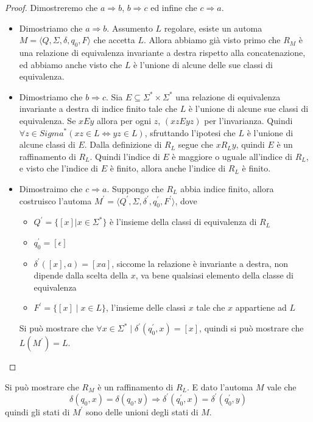 \documentclass[12pt]{article}
\begin{document}
\begin{proof}
	Dimostreremo che $a \Rightarrow b$, $b \Rightarrow c$ ed infine che $c \Rightarrow a$.
	\begin{itemize}
		\item Dimostriamo che $a \Rightarrow b$.
			Assumento $L$ regolare, esiste un automa $M = \langle Q, \Sigma, \delta, q_0, F\rangle$ che accetta $L$.
			Allora abbiamo già visto primo che $R_M$ è una relazione di equivalenza invariante a destra rispetto alla concatenazione, ed abbiamo anche visto che $L$ è l'unione di alcune delle sue classi di equivalenza.
		\item Dimostriamo che $b \Rightarrow c$.
			Sia $E \subseteq \Sigma^* \times \Sigma^*$ una relazione di equivalenza invariante a destra di indice finito tale che $L$ è l'unione di alcune sue classi di equivalenza.
			Se $x E y$ allora per ogni $z$, $(xz E yz)$ per l'invarianza.
			Quindi $ \forall z \in Sigma^* (xz \in L \Leftrightarrow yz \in L)$, sfruttando l'ipotesi che $L$ è l'unione di alcune classi di $E$.
			Dalla definizione di $R_L$ segue che $x R_L y$, quindi $E$ è un raffinamento di $R_L$.
			Quindi l'indice di $E$ è maggiore o uguale all'indice di $R_L$, e visto che l'indice di $E$ è finito, allora anche l'indice di $R_L$ è finito.
		\item Dimostraimo che $c \Rightarrow a$.
			Suppongo che $R_L$ abbia indice finito, allora costruisco l'automa $M^\prime = \langle Q^\prime, \Sigma, \delta^\prime, q_0^\prime, F^\prime \rangle$, dove 
			\begin{itemize}
				\item $Q^\prime = \{ [ x ] | x \in \Sigma^* \}$ è l'insieme della classi di equivalenza di $R_L$
				\item $q_0^\prime = [\epsilon]$
				\item $\delta^\prime([x], a) = [xa]$, siccome la relazione è invariante a destra, non dipende dalla scelta della $x$, va bene qualsiasi elemento della classe di equivalenza
				\item $F^\prime = \{ [x] \mid x \in L \}$, l'insieme delle classi $x$ tale che $x$ appartiene ad $L$
			\end{itemize}
			Si può mostrare che $\forall x \in \Sigma^* \mid \delta^\prime (q_0^\prime, x) = [x]$, quindi si può mostrare che $L(M^\prime) = L$.
	\end{itemize}
\end{proof}
Si può mostrare che $R_M$ è un raffinamento di $R_L$.
E dato l'automa $M$ vale che
$$ \delta(q_0, x) = \delta(q_0, y) \Rightarrow \delta^\prime(q_0^\prime, x) = \delta^\prime(q_0^\prime, y)$$
quindi gli stati di $M^\prime$ sono delle unioni degli stati di $M$.
\end{document}
